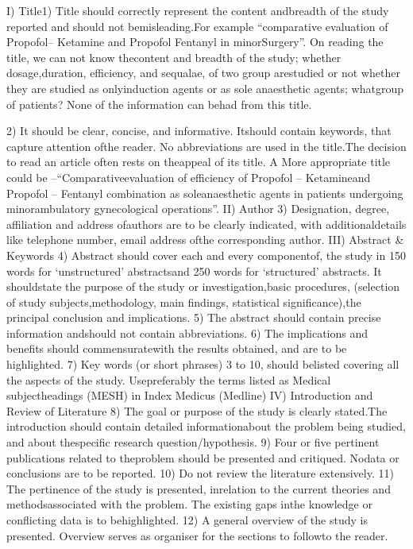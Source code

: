I)  Title1) Title should correctly represent the content andbreadth of the study reported and should  not bemisleading.For example “comparative evaluation of  Propofol– Ketamine and Propofol Fentanyl  in minorSurgery”. On reading the title, we can not know thecontent and breadth of the study; whether dosage,duration, efficiency, and sequalae, of two group arestudied or not whether they are studied as onlyinduction agents or as sole anaesthetic agents; whatgroup of patients? None of the information can behad from this title.

2) It should be clear, concise, and informative. Itshould contain keywords, that capture attention ofthe reader. No abbreviations are used in the title.The decision to read an article often  rests on theappeal of its title.      A More appropriate title could be –“Comparativeevaluation of efficiency of Propofol – Ketamineand Propofol – Fentanyl combination as soleanaesthetic agents in patients undergoing minorambulatory  gynecological operations”.
II) Author
3) Designation,  degree, affiliation and address ofauthors are to be clearly indicated, with additionaldetails like telephone   number, email  address ofthe corresponding author.
III) Abstract  & Keywords
4) Abstract should cover each and every componentof, the study in 150 words for ‘unstructured’ abstractsand 250  words for ‘structured’  abstracts. It shouldstate the purpose of the study or investigation,basic procedures, (selection of study subjects,methodology, main findings, statistical significance),the principal conclusion and implications.
5) The abstract should contain precise information andshould not contain abbreviations.
6) The implications and benefits should commensuratewith the results obtained, and are to be highlighted.
7) Key words (or short phrases) 3 to 10, should belisted covering all the aspects of the study. Usepreferably the terms listed as Medical subjectheadings (MESH) in Index Medicus (Medline)
IV) Introduction and Review of Literature
8) The goal or purpose of the study is clearly stated.The introduction should contain detailed informationabout the problem being studied,   and about thespecific research question/hypothesis.
9) Four or five pertinent publications related to theproblem should be presented and critiqued.  Nodata or conclusions are to be reported.
10) Do not review the literature  extensively.
11) The pertinence of the study is  presented,  inrelation to the current theories and methodsassociated with the problem. The existing gaps  inthe knowledge or conflicting data is to behighlighted.
12) A general overview of the study is presented. Overview serves as   organiser for the sections to followto the reader.


